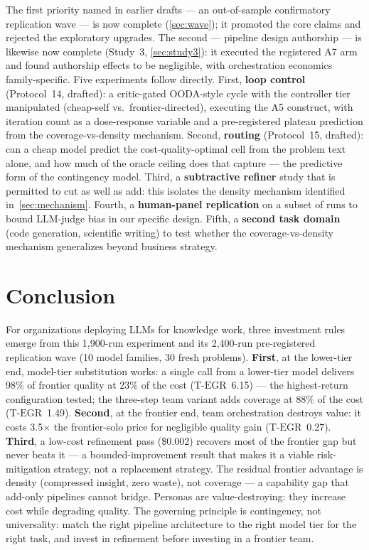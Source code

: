\documentclass[12pt,a4paper]{article}
\newcommand{\TEGR}{\ensuremath{\text{T-EGR}}}
\begin{document}
The first priority named in earlier drafts --- an out-of-sample confirmatory
replication wave --- is now complete (\cref{sec:wave}); it promoted the core
claims and rejected the exploratory upgrades. The second --- pipeline design
authorship --- is likewise now complete (Study~3, \cref{sec:study3}): it
executed the registered A7 arm and found authorship effects to be negligible,
with orchestration economics family-specific. Five experiments follow directly.
First, \textbf{loop
control} (Protocol~14, drafted): a critic-gated OODA-style cycle with the
controller tier manipulated (cheap-self vs.\ frontier-directed), executing the
A5 construct, with iteration count as a dose-response variable and a
pre-registered plateau prediction from the coverage-vs-density mechanism.
Second, \textbf{routing} (Protocol~15, drafted): can a cheap model predict the
cost-quality-optimal cell from the problem text alone, and how much of the
oracle ceiling does that capture --- the predictive form of the contingency
model. Third, a \textbf{subtractive refiner} study
that is permitted to cut as well as add: this isolates the density mechanism
identified in~\cref{sec:mechanism}. Fourth, a \textbf{human-panel replication}
on a subset of runs to bound LLM-judge bias in our specific design. Fifth, a
\textbf{second task domain} (code generation, scientific writing) to test
whether the coverage-vs-density mechanism generalizes beyond business strategy.

\section{Conclusion}\label{sec:conclusion}

For organizations deploying LLMs for knowledge work, three investment rules
emerge from this 1{,}900-run experiment and its 2{,}400-run pre-registered
replication wave (10 model families, 30 fresh problems). \textbf{First}, at the lower-tier end,
model-tier substitution works: a single call from a lower-tier model
delivers 98\% of frontier quality at 23\% of the cost ($\TEGR$~6.15) --- the
highest-return configuration tested; the three-step team variant adds coverage
at 88\% of the cost ($\TEGR$~1.49). \textbf{Second}, at the frontier end, team
orchestration destroys value: it costs 3.5$\times$ the frontier-solo price for
negligible quality gain ($\TEGR$~0.27). \textbf{Third}, a low-cost refinement pass
(\$0.002) recovers most of the frontier gap but never beats it --- a
bounded-improvement result that makes it a viable risk-mitigation strategy, not
a replacement strategy. The residual frontier advantage is density (compressed
insight, zero waste), not coverage --- a capability gap that add-only pipelines
cannot bridge. Personas are value-destroying: they increase cost while degrading
quality. The governing principle is contingency, not universality: match the
right pipeline architecture to the right model tier for the right task, and
invest in refinement before investing in a frontier team.
\end{document}
